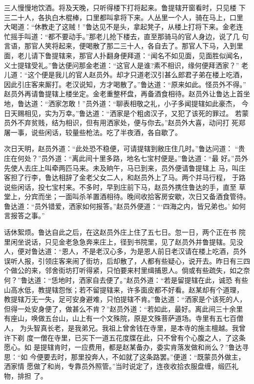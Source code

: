 三人慢慢地饮酒。将及天晚，只听得楼下打将起来。鲁提辖开窗看时，只见楼
下三二十人，各执白木棍棒，口里都叫拿将下来。人丛里一个人，骑在马上，口里
大喝道：“休教走了这贼！”鲁达见不是头，拿起凳子，从楼上打将下来。金老连
忙摇手叫道：“都不要动手。”那老儿抢下楼去，直至那骑马的官人身边，说了几
句言语，那官人笑将起来，便喝散了那二三十人，各自去了。那官人下马，入到里
面，老儿请下鲁提辖来，那官人扑翻身便拜道：“闻名不如见面，见面胜似闻名，
义士提辖受礼。”鲁达便问那金老道：“这官人是谁?素不相识，缘何便拜洒家？”
老儿道：“这个便是我儿的官人赵员外。却才只道老汉引甚么郎君子弟在楼上吃酒，
因此引庄客来厮打。老汉说知，方才喝散了。”鲁达道：“原来如此。怪员外不得。”
赵员外再请鲁提辖上楼坐定。金老重整杯盘，再备酒食相待。赵员外让鲁达上首坐
地，鲁达道：“洒家怎敢！”员外道：“聊表相敬之礼，小子多闻提辖如此豪杰，
今日天赐相见，实为万幸。”鲁达道：“洒家是个粗卤汉子，又犯了该死的罪过。
若蒙员外不弃贫贱，结为相识，但有用洒家处，便与你去。”赵员外大喜，动问打
死郑屠一事，说些闲话，较量些枪法。吃了半夜酒，各自歇了。

次日天明，赵员外道：“此处恐不稳便，可请提辖到敝庄住几时。”鲁达问道：
“贵庄在何处？”员外道：“离此间十里多路，地名七宝村便是。”鲁达道：“最
好。”员外先使人去庄上叫牵两匹马来。未及晌午，马已到来，员外便请鲁提辖上
马，叫庄客担了行李，鲁达相辞了金老父女二人，和赵员外上了马。两个并马行程，
于路说些闲话，投七宝村来。不多时，早到庄前下马，赵员外携住鲁达的手，直至
草堂上，分宾而坐；一面叫杀羊置酒相待。晚间收拾客房安歇，次日又备酒食管待。
鲁达道：“员外错爱，洒家如何报答。”赵员外便道：“‘四海之内，皆兄弟也。’
如何言报答之事。”

话休絮烦。鲁达自此之后，在这赵员外庄上住了五七日。忽一日，两个正在书
院里闲坐说话，只见金老急急奔来庄上，径到书院里，见了赵员外并鲁提辖。见没
人，便对鲁达道：“恩人，不是老汉心多，为是恩人前日老汉请在楼上吃酒，员外
误听人报，引领庄客来闹了街坊，后却散了，人都有些疑心，说开去。昨日有三四
个做公的来，邻舍街坊打听得紧，只怕要来村里缉捕恩人。倘或有些疏失，如之奈
何？”鲁达道：“恁地时，洒家自去便了。”赵员外道：“若是留提辖在此，诚恐
有些山高水低，教提辖怨怅；若不留提辖来，许多面皮都不好看。赵某却有个道理，
教提辖万无一失，足可安身避难，只怕提辖不肯。”鲁达道：“洒家是个该死的人，
但得一处安身便了，做甚么不肯？”赵员外道：“若如此，最好。离此间三十余里
有座山，唤做五台山，山上有一个文殊院，原是文殊菩萨道场。寺里有五七百僧人，
为头智真长老，是我弟兄。我祖上曾舍钱在寺里，是本寺的施主檀越。我曾许下剃
度一僧在寺里，已买下一道五花度牒在此，只不曾有个心腹之人，了这条愿心。如
是提辖肯时，一应费用，都是赵某备办，委实肯落发做和尚么？”鲁达寻思：“如
今便要去时，那里投奔人，不如就了这条路罢。”便道：“既蒙员外做主，洒家情
愿做了和尚，专靠员外照管。”当时说定了，连夜收拾衣服盘缠，缎匹礼物，排担
了。


